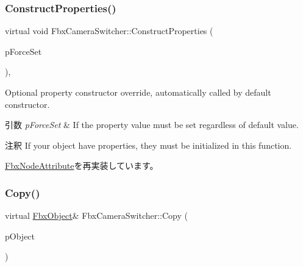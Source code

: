 \mbox{\label{class_fbx_camera_switcher_a38011053f3a61df4e93989d7c970fa16}} 
\subsubsection{\texorpdfstring{Construct\+Properties()}{ConstructProperties()}}
{\footnotesize\ttfamily virtual void Fbx\+Camera\+Switcher\+::\+Construct\+Properties (\begin{DoxyParamCaption}\item[{bool}]{p\+Force\+Set }\end{DoxyParamCaption})\hspace{0.3cm}{\ttfamily [protected]}, {\ttfamily [virtual]}}

Optional property constructor override, automatically called by default constructor. 
\begin{DoxyParams}{引数}
{\em p\+Force\+Set} & If the property value must be set regardless of default value. \\
\hline
\end{DoxyParams}
\begin{DoxyRemark}{注釈}
If your object have properties, they must be initialized in this function. 
\end{DoxyRemark}


\hyperlink{class_fbx_node_attribute_a042eb9949a9b9634dcc5f126e82fd04a}{Fbx\+Node\+Attribute}を再実装しています。

\mbox{\label{class_fbx_camera_switcher_a4f9ed75fe53a90e3bfae94415714fc99}} 
\subsubsection{\texorpdfstring{Copy()}{Copy()}}
{\footnotesize\ttfamily virtual \hyperlink{class_fbx_object}{Fbx\+Object}\& Fbx\+Camera\+Switcher\+::\+Copy (\begin{DoxyParamCaption}\item[{const \hyperlink{class_fbx_object}{Fbx\+Object} \&}]{p\+Object }\end{DoxyParamCaption})\hspace{0.3cm}{\ttfamily [virtual]}}

